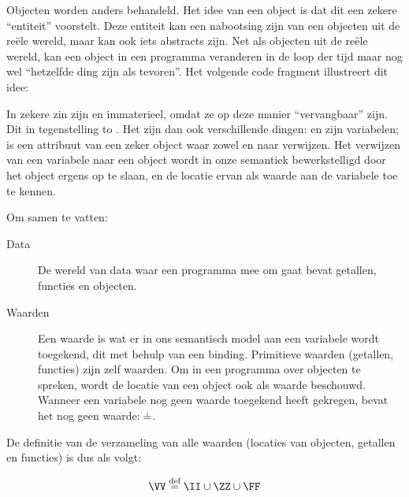 Objecten worden anders behandeld. Het idee van een object is dat dit een zekere “entiteit” voorstelt. Deze entiteit kan een nabootsing zijn van een objecten uit de reële wereld, maar kan ook iets abstracts zijn. Net als objecten uit de reële wereld, kan een object in een programma veranderen in de loop der tijd maar nog wel “hetzelfde ding zijn als tevoren”. Het volgende code fragment illustreert dit idee:

\begin{NoBreak}
  \codeFragmentCaption
\end{NoBreak}

In zekere zin zijn  en  immaterieel, omdat ze op deze manier “vervangbaar” zijn. Dit in tegenstelling to . Het zijn dan ook verschillende dingen:  en  zijn variabelen;  is een attribuut van een zeker object waar zowel  en  naar verwijzen.
Het verwijzen van een variabele naar een object wordt in onze semantiek bewerkstelligd door het object ergens op te slaan, en de locatie ervan als waarde aan de variabele toe te kennen.

Om samen te vatten:
\begin{description}
  \item[Data] De wereld van data waar een programma mee om gaat bevat getallen, functies en objecten.
  \item[Waarden] Een waarde is wat er in ons semantisch model aan een variabele wordt toegekend, dit met behulp van een binding. Primitieve waarden (getallen, functies) zijn zelf waarden. Om in een programma over objecten te spreken, wordt de locatie van een object ook als waarde beschouwd. Wanneer een variabele nog geen waarde toegekend heeft gekregen, bevat het nog geen waarde: $\nil$.
\end{description}

De definitie van de verzameling van alle waarden (locaties van objecten, getallen en functies) is dus als volgt:

\begin{equation*}
  \VV \DEF \II \cup \ZZ \cup \FF
\end{equation*}

